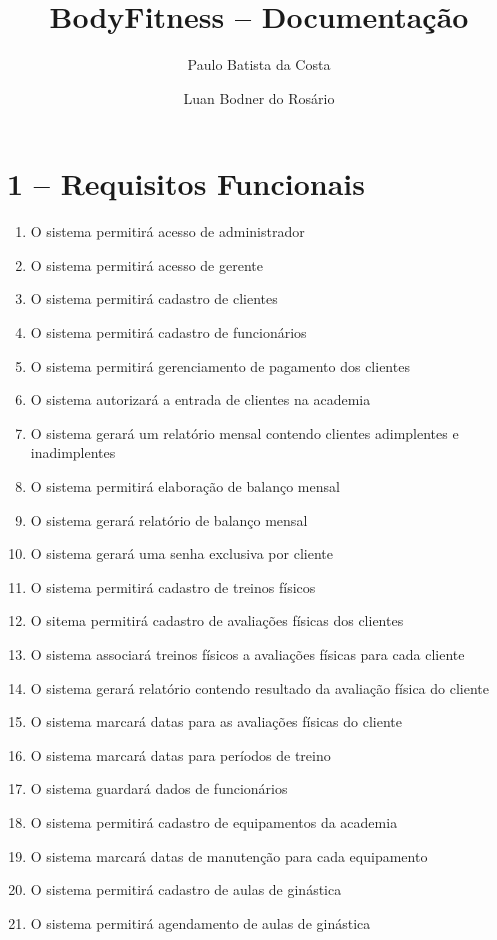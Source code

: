 \documentclass[12pt,a4paper,oneside]{report}
\author{Paulo Batista da Costa \and Luan Bodner do Rosário}
\title{BodyFitness -- Documentação}
\begin{document}
	\maketitle
	\section*{1 -- Requisitos Funcionais}

	\begin{enumerate}
		
		 \item O sistema permitirá acesso de administrador
		 \item O sistema permitirá acesso de gerente
		 \item O sistema permitirá cadastro de clientes
		 \item O sistema permitirá cadastro de funcionários
		 \item O sistema permitirá gerenciamento de pagamento dos clientes
		 \item O sistema autorizará a entrada de clientes na academia
		 \item O sistema gerará um relatório mensal contendo clientes adimplentes e inadimplentes 
		 \item O sistema permitirá elaboração de balanço mensal
		 \item O sistema gerará relatório de balanço mensal
		 \item O sistema gerará uma senha exclusiva por cliente
		 \item O sistema permitirá cadastro de treinos físicos
		 \item O sitema permitirá cadastro de avaliações físicas dos clientes
		 \item O sistema associará treinos físicos a avaliações físicas para cada cliente
		 \item O sistema gerará relatório contendo resultado da avaliação física do cliente
		 \item O sistema marcará datas para as avaliações físicas do cliente
		 \item O sistema marcará datas para períodos de treino
		 \item O sistema guardará dados de funcionários
		 \item O sistema permitirá cadastro de equipamentos da academia
		 \item O sistema marcará datas de manutenção para cada equipamento
		 \item O sistema permitirá cadastro de aulas de ginástica
		 \item O sistema permitirá agendamento de aulas de ginástica
	

	\end{enumerate}
	
	
\end{document}
